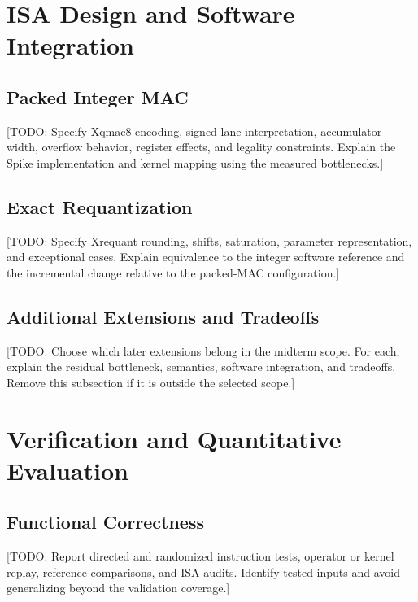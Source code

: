 \documentclass[10pt,a4paper,twocolumn]{article}
\newcommand{\todo}[1]{\textcolor{blue!60!black}{[TODO: #1]}}
\begin{document}

\section{ISA Design and Software Integration}
\label{sec:design}
\subsection{Packed Integer MAC}
\todo{Specify Xqmac8 encoding, signed lane interpretation, accumulator width,
overflow behavior, register effects, and legality constraints. Explain the Spike
implementation and kernel mapping using the measured bottlenecks.}

\subsection{Exact Requantization}
\todo{Specify Xrequant rounding, shifts, saturation, parameter representation,
and exceptional cases. Explain equivalence to the integer software reference
and the incremental change relative to the packed-MAC configuration.}

\subsection{Additional Extensions and Tradeoffs}
\todo{Choose which later extensions belong in the midterm scope. For each,
explain the residual bottleneck, semantics, software integration, and tradeoffs.
Remove this subsection if it is outside the selected scope.}

\section{Verification and Quantitative Evaluation}
\label{sec:evaluation}
\subsection{Functional Correctness}
\todo{Report directed and randomized instruction tests, operator or kernel
replay, reference comparisons, and ISA audits. Identify tested inputs and avoid
generalizing beyond the validation coverage.}
\end{document}
